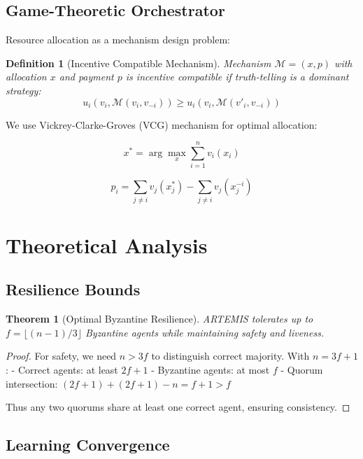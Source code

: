 \documentclass[conference]{IEEEtran}
\newtheorem{theorem}{Theorem}
\newtheorem{definition}{Definition}
\begin{document}
\subsection{Game-Theoretic Orchestrator}

Resource allocation as a mechanism design problem:

\begin{definition}[Incentive Compatible Mechanism]
Mechanism $\mathcal{M} = (x, p)$ with allocation $x$ and payment $p$ is incentive compatible if truth-telling is a dominant strategy:
\begin{equation}
u_i(v_i, \mathcal{M}(v_i, v_{-i})) \geq u_i(v_i, \mathcal{M}(v'_i, v_{-i}))
\end{equation}
\end{definition}

We use Vickrey-Clarke-Groves (VCG) mechanism for optimal allocation:

\begin{equation}
x^* = \arg\max_x \sum_{i=1}^n v_i(x_i)
\end{equation}

\begin{equation}
p_i = \sum_{j \neq i} v_j(x^*_j) - \sum_{j \neq i} v_j(x^{-i}_j)
\end{equation}

\section{Theoretical Analysis}

\subsection{Resilience Bounds}

\begin{theorem}[Optimal Byzantine Resilience]
ARTEMIS tolerates up to $f = \lfloor(n-1)/3\rfloor$ Byzantine agents while maintaining safety and liveness.
\end{theorem}

\begin{proof}
For safety, we need $n > 3f$ to distinguish correct majority. With $n = 3f + 1$:
- Correct agents: at least $2f + 1$
- Byzantine agents: at most $f$
- Quorum intersection: $(2f + 1) + (2f + 1) - n = f + 1 > f$

Thus any two quorums share at least one correct agent, ensuring consistency.
\end{proof}

\subsection{Learning Convergence}
\end{document}
